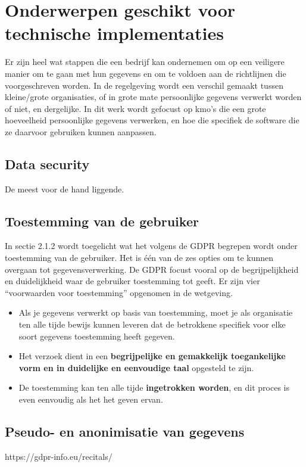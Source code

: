 \section{{Onderwerpen geschikt voor technische implementaties}}

Er zijn heel wat stappen die een bedrijf kan ondernemen om op een veiligere manier om te gaan met hun gegevens en om te voldoen aan de richtlijnen die voorgeschreven worden. 
In de regelgeving wordt een verschil gemaakt tussen kleine/grote organisaties, of in grote mate persoonlijke gegevens verwerkt worden of niet, en dergelijke. In dit werk wordt gefocust op kmo's die een grote hoeveelheid persoonlijke gegevens verwerken, en hoe die specifiek de software die ze daarvoor gebruiken kunnen aanpassen. 


\subsection{Data security}
De meest voor de hand liggende. 

\subsection{Toestemming van de gebruiker}
In sectie 2.1.2 wordt toegelicht wat het volgens de GDPR begrepen wordt onder toestemming van de gebruiker. Het is één van de zes opties om te kunnen overgaan tot gegevensverwerking. De GDPR focust vooral op de begrijpelijkheid en duidelijkheid waar de gebruiker toestemming tot geeft. Er zijn vier “voorwaarden voor toestemming” opgenomen in de wetgeving. 
\begin{itemize}
    \item  Als je gegevens verwerkt op basis van toestemming, moet je als organisatie ten alle tijde bewijs kunnen leveren dat de betrokkene specifiek voor elke soort gegevens toestemming heeft gegeven. 
    \item  Het verzoek dient in een \textbf{begrijpelijke en gemakkelijk toegankelijke vorm en in duidelijke en eenvoudige taal} opgesteld te zijn. 
    \item  
    De toestemming kan ten alle tijde \textbf{ingetrokken worden}, en dit proces is even eenvoudig als het het geven ervan. 
\end{itemize}


 

\subsection{Pseudo- en anonimisatie van gegevens}
https://gdpr-info.eu/recitals/



